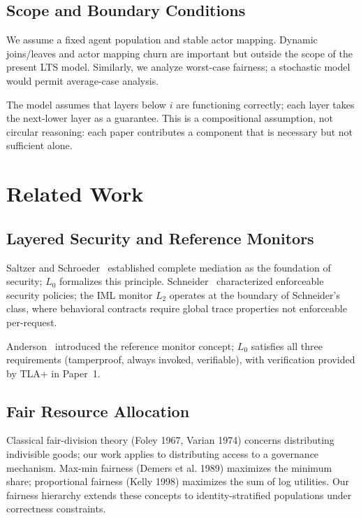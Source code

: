 \documentclass[11pt]{article}
\newcommand{\Layer}[1]{L_{#1}}
\begin{document}
\subsection{Scope and Boundary Conditions}

We assume a fixed agent population and stable actor mapping. Dynamic joins/leaves and actor mapping churn are important but outside the scope of the present LTS model. Similarly, we analyze worst-case fairness; a stochastic model would permit average-case analysis.

The model assumes that layers below $i$ are functioning correctly; each layer takes the next-lower layer as a guarantee. This is a compositional assumption, not circular reasoning: each paper contributes a component that is necessary but not sufficient alone.

\section{Related Work}
\label{sec:related}

\subsection{Layered Security and Reference Monitors}

Saltzer and Schroeder~\cite{saltzer1975} established complete mediation as the foundation of security; $\Layer{0}$ formalizes this principle. Schneider~\cite{schneider2000} characterized enforceable security policies; the IML monitor $\Layer{2}$ operates at the boundary of Schneider's class, where behavioral contracts require global trace properties not enforceable per-request.

Anderson~\cite{anderson1972} introduced the reference monitor concept; $\Layer{0}$ satisfies all three requirements (tamperproof, always invoked, verifiable), with verification provided by TLA+ in Paper~1.

\subsection{Fair Resource Allocation}

Classical fair-division theory (Foley 1967, Varian 1974) concerns distributing indivisible goods; our work applies to distributing access to a governance mechanism. Max-min fairness (Demers et al. 1989) maximizes the minimum share; proportional fairness (Kelly 1998) maximizes the sum of log utilities. Our fairness hierarchy extends these concepts to identity-stratified populations under correctness constraints.
\end{document}
